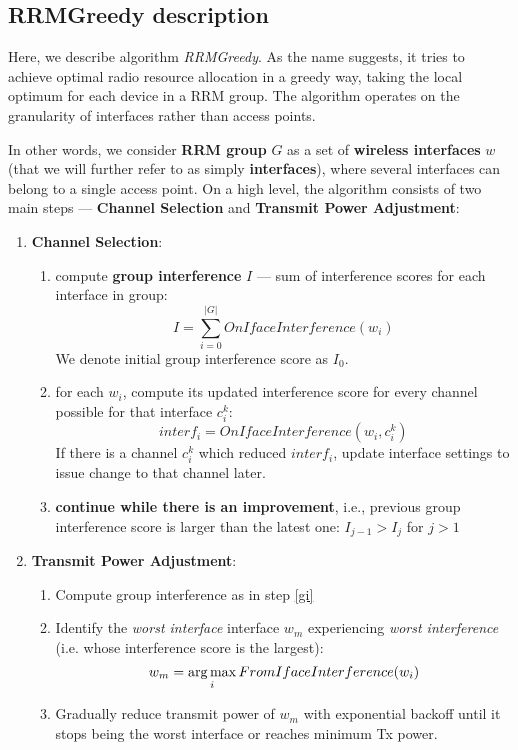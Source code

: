 \subsection{RRMGreedy description}
Here, we describe algorithm \textit{RRMGreedy}.
As the name suggests, it tries to achieve optimal radio resource allocation in a greedy way, taking the local optimum for each device in a RRM group.
The algorithm operates on the granularity of interfaces rather than access points.

In other words, we consider \textbf{RRM group} $G$ as a set of \textbf{wireless interfaces} $w$ (that we will further refer to as simply \textbf{interfaces}), where several interfaces can belong to a single access point.
On a high level, the algorithm consists of two main steps --- \textbf{Channel Selection} and \textbf{Transmit Power Adjustment}:
\everymath{\displaystyle} %
\begin{enumerate}
\item \textbf{Channel Selection}:
    \begin{enumerate}
        \item \label{gi} compute \textbf{group interference} $I$ --- sum of interference scores for each interface in group:
            \begin{equation}
                I = \sum_{i=0}^{\lvert G \rvert} OnIfaceInterference(w_i)
            \end{equation}
        We denote initial group interference score as $I_{0}$.
        \item for each $w_i$, compute its updated interference score for every channel possible for that interface $c^k_i$:
            \begin{equation}
                interf_i = OnIfaceInterference(w_i, c^k_i)
            \end{equation}
        If there is a channel $c^k_i$ which reduced $interf_i$, update interface settings to issue change to that channel later.
        \item \textbf{continue while there is an improvement}, i.e., previous group interference score is larger than the latest one:
        $I_{j-1} > I_{j}$ for $j > 1$
    \end{enumerate}
\item \textbf{Transmit Power Adjustment}:
    \begin{enumerate}
        \item Compute group interference as in step \ref{gi}
        \item Identify the \textit{worst interface} interface $w_m$ experiencing \textit{worst interference} (i.e. whose interference score is the largest):
            \begin{equation}
                w_m = \operatorname*{arg\,max}_i FromIfaceInterference(w_i)
            \end{equation}
        \item Gradually reduce transmit power of $w_m$ with exponential backoff until it stops being the worst interface or reaches minimum Tx power.
    \end{enumerate}
\end{enumerate}

